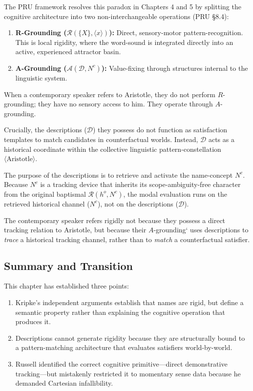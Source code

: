 \documentclass[10pt]{article}
\providecommand{\tightlist}{}
\begin{document}
The PRU framework resolves this paradox in Chapters 4 and 5 by splitting the cognitive architecture into two non-interchangeable operations (PRU §8.4):

\begin{enumerate}
\def\labelenumi{\arabic{enumi}.}
\tightlist
\item
  \textbf{R-Grounding (\(\mathcal{R}(\{X\}, \langle x \rangle)\)):} Direct, sensory-motor pattern-recognition. This is local rigidity, where the word-sound is integrated directly into an active, experienced attractor basin.
\item
  \textbf{A-Grounding (\(\mathcal{A}(\mathcal{D}, N^c)\)):} Value-fixing through structures internal to the linguistic system.
\end{enumerate}

When a contemporary speaker refers to Aristotle, they do not perform \(R\)-grounding; they have no sensory access to him. They operate through \(A\)-grounding.

Crucially, the descriptions (\(\mathcal{D}\)) they possess do not function as satisfaction templates to match candidates in counterfactual worlds. Instead, \(\mathcal{D}\) acts as a historical coordinate within the collective linguistic pattern-constellation \(\langle \text{Aristotle} \rangle\).

The purpose of the descriptions is to retrieve and activate the name-concept \(N^c\). Because \(N^c\) is a tracking device that inherits its scope-ambiguity-free character from the original baptismal \(\mathcal{R}(h^o, N^c)\), the modal evaluation runs on the retrieved historical channel (\(N^c\)), not on the descriptions (\(\mathcal{D}\)).

The contemporary speaker refers rigidly not because they possess a direct tracking relation to Aristotle, but because their \(A\)-grounding` uses descriptions to \emph{trace} a historical tracking channel, rather than to \emph{match} a counterfactual satisfier.

\subsection{Summary and Transition}\label{summary-and-transition}

This chapter has established three points:

\begin{enumerate}
\def\labelenumi{\arabic{enumi}.}
\tightlist
\item
  Kripke's independent arguments establish that names are rigid, but define a semantic property rather than explaining the cognitive operation that produces it.
\item
  Descriptions cannot generate rigidity because they are structurally bound to a pattern-matching architecture that evaluates satisfiers world-by-world.
\item
  Russell identified the correct cognitive primitive---direct demonstrative tracking---but mistakenly restricted it to momentary sense data because he demanded Cartesian infallibility.
\end{enumerate}
\end{document}
